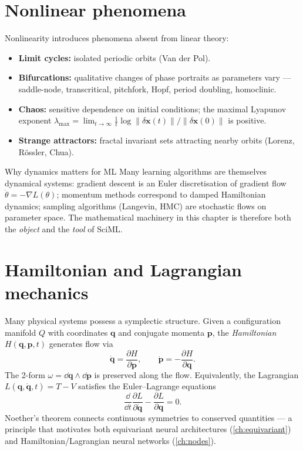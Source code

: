 \section{Nonlinear phenomena}
Nonlinearity introduces phenomena absent from linear theory:
\begin{itemize}
\item \textbf{Limit cycles:} isolated periodic orbits (Van der Pol).
\item \textbf{Bifurcations:} qualitative changes of phase portraits as
parameters vary --- saddle-node, transcritical, pitchfork, Hopf, period
doubling, homoclinic.
\item \textbf{Chaos:} sensitive dependence on initial conditions; the
maximal Lyapunov exponent
$\lambda_{\max}=\lim_{t\to\infty}\tfrac{1}{t}\log\|\delta\bm{x}(t)\|/\|\delta\bm{x}(0)\|$
is positive.
\item \textbf{Strange attractors:} fractal invariant sets attracting
nearby orbits (Lorenz, R\"ossler, Chua).
\end{itemize}

\begin{insight}{Why dynamics matters for ML}
Many learning algorithms are themselves dynamical systems: gradient
descent is an Euler discretisation of gradient flow $\dot\theta=-\nabla
L(\theta)$; momentum methods correspond to damped Hamiltonian
dynamics; sampling algorithms (Langevin, HMC) are stochastic flows on
parameter space. The mathematical machinery in this chapter is therefore
both the \emph{object} and the \emph{tool} of SciML.
\end{insight}

\section{Hamiltonian and Lagrangian mechanics}
Many physical systems possess a symplectic structure. Given a
configuration manifold $Q$ with coordinates $\bm{q}$ and conjugate
momenta $\bm{p}$, the \emph{Hamiltonian} $H(\bm{q},\bm{p},t)$ generates
flow via
\begin{equation}
\dot{\bm{q}}=\frac{\partial H}{\partial \bm{p}},\qquad
\dot{\bm{p}}=-\frac{\partial H}{\partial \bm{q}}.
\end{equation}
The 2-form $\omega=\dd\bm{q}\wedge\dd\bm{p}$ is preserved along the
flow. Equivalently, the Lagrangian $L(\bm{q},\dot{\bm{q}},t)=T-V$
satisfies the Euler--Lagrange equations
\begin{equation}
\frac{\dd}{\dd t}\frac{\partial L}{\partial \dot{\bm{q}}}-\frac{\partial L}{\partial \bm{q}}=0.
\end{equation}
Noether's theorem connects continuous symmetries to conserved
quantities --- a principle that motivates both equivariant neural
architectures (\cref{ch:equivariant}) and Hamiltonian/Lagrangian neural
networks (\cref{ch:nodes}).

